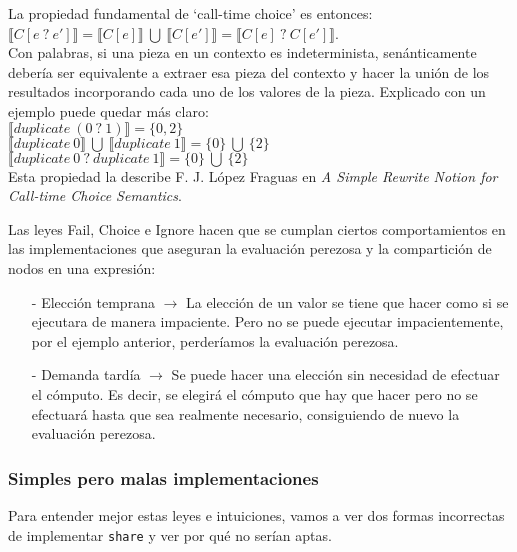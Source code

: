 \documentclass[class=article, crop=false]{standalone}
\begin{document}
La propiedad fundamental de `call-time choice' es entonces: \\
$\llbracket C[e \: ? \: e']\rrbracket
=\llbracket C[e]\rrbracket \:\bigcup\: \llbracket C[e']\rrbracket
=\llbracket C[e] \:?\: C[e']\rrbracket$. \\
Con palabras, si una pieza en un contexto es
indeterminista, senánticamente debería ser equivalente a extraer esa pieza del contexto y
hacer la unión de los resultados incorporando cada uno de los valores de la pieza. Explicado
con un ejemplo puede quedar más claro: \\
$\llbracket duplicate \: (0 \: ? \: 1)\rrbracket = \{0, 2\}$ \\
$\llbracket duplicate \:0\rrbracket\:\bigcup\:\llbracket duplicate \: 1\rrbracket
=\{0\} \:\bigcup\: \{2\}$ \\
$\llbracket duplicate \:0 \:?\: duplicate \:1\rrbracket = \{0\} \:\bigcup\: \{2\}$ \\
Esta propiedad la describe F. J. López Fraguas en \textit{A Simple Rewrite Notion for
Call-time Choice Semantics}\cite{lopez2007simple}.

Las leyes Fail, Choice e Ignore hacen que se cumplan ciertos comportamientos en las
implementaciones que aseguran la evaluación perezosa y la compartición de nodos en una
expresión:

\begin{itemize}
  \item[-] Elección temprana $\rightarrow$ La elección de un valor se tiene que hacer como si
  se ejecutara de manera impaciente. Pero no se puede ejecutar impacientemente, por el
  ejemplo anterior, perderíamos la evaluación perezosa.
  \item[-] Demanda tardía $\rightarrow$ Se puede hacer una elección sin necesidad de efectuar
  el cómputo. Es decir, se elegirá el cómputo que hay que hacer pero no se efectuará hasta
  que sea realmente necesario, consiguiendo de nuevo la evaluación perezosa.
\end{itemize}
\newpage

\subsubsection{Simples pero malas implementaciones}
Para entender mejor estas leyes e intuiciones, vamos a ver dos formas incorrectas de
implementar \verb`share` y ver por qué no serían aptas.
\end{document}
